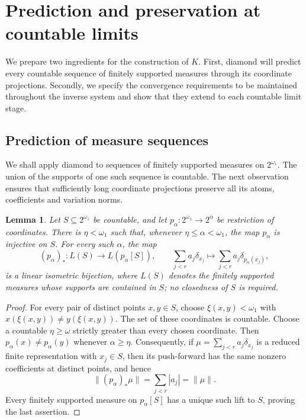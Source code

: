 \documentclass[a4paper,11pt]{amsart}
\theoremstyle{plain}
\newtheorem{lemma}[theorem]{Lemma}
\theoremstyle{definition}
\theoremstyle{remark}
\numberwithin{equation}{section}
\begin{document}
\section{Prediction and preservation at countable limits}\label{sec:limits}

We prepare two ingredients for the construction of $K$. First, diamond
will predict every countable sequence of finitely supported measures
through its coordinate projections. Secondly, we specify the convergence
requirements to be maintained throughout the inverse system and show
that they extend to each countable limit stage.

\subsection{Prediction of measure sequences}\label{subsec:prediction}

We shall apply diamond to sequences of finitely supported measures on $2^{\omega_1}$.  The union of the supports of one such sequence is countable.  The next observation ensures that sufficiently long coordinate projections preserve all its atoms, coefficients and variation norms.

\begin{lemma}\label{lem:support-projection}
Let $S\subseteq2^{\omega_1}$ be countable, and let
$p_\alpha:2^{\omega_1}\to2^\alpha$ be restriction of coordinates.
There is $\eta<\omega_1$ such that, whenever
$\eta\leqslant\alpha<\omega_1$, the map $p_\alpha$ is injective on $S$.
For every such $\alpha$, the map
\[
 (p_\alpha)_*:L(S)\longrightarrow L(p_\alpha[S]),
 \qquad \sum_{j<r}a_j\delta_{x_j}
       \longmapsto\sum_{j<r}a_j\delta_{p_\alpha(x_j)},
\]
is a linear isometric bijection, where $L(S)$ denotes the finitely
supported measures whose supports are contained in $S$; no closedness
of $S$ is required.
\end{lemma}
\begin{proof}
For every pair of distinct points $x,y\in S$, choose
$\xi(x,y)<\omega_1$ with $x(\xi(x,y))\neq y(\xi(x,y))$.
The set of these coordinates is countable.  Choose a countable
$\eta\geqslant\omega$ strictly greater than every chosen coordinate.
Then $p_\alpha(x)\neq p_\alpha(y)$ whenever $\alpha\geqslant\eta$.
Consequently, if $\mu=\sum_{j<r}a_j\delta_{x_j}$ is a reduced finite
representation with $x_j\in S$, then its push-forward has the same
nonzero coefficients at distinct points, and hence
\[
 \|(p_\alpha)_*\mu\|=\sum_{j<r}|a_j|=\|\mu\|.
\]
Every finitely supported measure on $p_\alpha[S]$ has a unique such
lift to $S$, proving the last assertion.
\end{proof}
\end{document}
